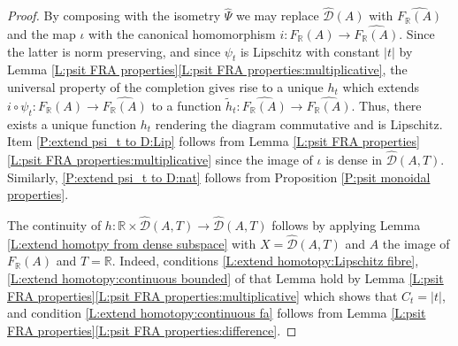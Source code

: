\documentclass[12pt]{amsart}
\theoremstyle{definition}
\def\RR{\ensuremath{\mathbb{R}}}
\def\Free{F}
\def\D{\mathcal{D}}
\def\tD{\hat{\D}}
\begin{document}
\begin{proof}
By composing with the isometry $\hat{\Psi}$  we may replace $\tD(A)$ with $\widehat{\Free_\RR(A)}$ and the map $\iota$ with the canonical homomorphism $i \colon \Free_\RR(A) \to \widehat{\Free_\RR(A)}$.
Since the latter is norm preserving, and since $\psi_t$ is Lipschitz with constant $|t|$ by Lemma \ref{L:psit FRA properties}\ref{L:psit FRA properties:multiplicative}, the universal property of the completion gives rise to a unique $h_t$  which extends $i \circ \psi_t \colon \Free_\RR(A) \to \widehat{\Free_\RR(A)}$ to a function $\tilde{h}_t \colon \widehat{\Free_\RR(A)} \to \widehat{\Free_\RR(A)}$.
Thus, there exists a unique function $h_t$ rendering the diagram commutative and is Lipschitz.
Item \ref{P:extend psi_t to D:Lip} follows from Lemma \ref{L:psit FRA properties}\ref{L:psit FRA properties:multiplicative} since the image of $\iota$ is dense in $\tD(A,T)$.
Similarly, \ref{P:extend psi_t to D:nat} follows from Proposition \ref{P:psit monoidal properties}.

The continuity of $h \colon \RR \times \tD(A,T) \to \tD(A,T)$ follows by applying  Lemma \ref{L:extend homotpy from dense subspace} with $X=\tD(A,T)$ and $A$ the image of $\Free_\RR(A)$ and $T=\RR$.
Indeed, conditions \ref{L:extend homotopy:Lipschitz fibre}, \ref{L:extend homotopy:continuous bounded} of that Lemma hold by Lemma \ref{L:psit FRA properties}\ref{L:psit FRA properties:multiplicative} which shows that $C_t=|t|$, and condition \ref{L:extend homotopy:continuous fa} follows from Lemma \ref{L:psit FRA properties}\ref{L:psit FRA properties:difference}.

\end{proof}
\end{document}
